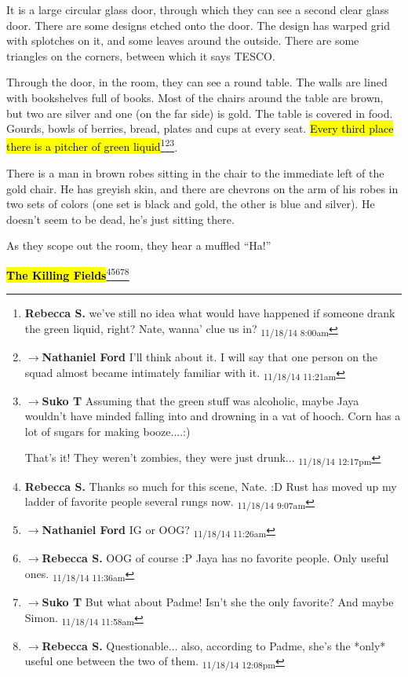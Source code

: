 It is a large circular glass door, through which they can see a second clear glass door.  There are some designs etched onto the door.  The design has warped grid with splotches on it, and some leaves around the outside.  There are some triangles on the corners, between which it says TESCO.



Through the door, in the room, they can see a round table.  The walls are lined with bookshelves full of books.  Most of the chairs around the table are brown, but two are silver and one (on the far side) is gold.  The table is covered in food.  Gourds, bowls of berries, bread, plates and cups at every seat.  \hl{Every third place there is a pitcher of green liquid}\footnote{\textbf{Rebecca S. }we've still no idea what would have happened if someone drank the green liquid, right?  Nate, wanna' clue us in? \textsubscript{11/18/14 8:00am}}\footnote{$\rightarrow$\textbf{Nathaniel Ford }I'll think about it. I will say that one person on the squad almost became intimately familiar with it. \textsubscript{11/18/14 11:21am}}\footnote{$\rightarrow$\textbf{Suko T }Assuming that the green stuff was alcoholic, maybe Jaya wouldn't have minded falling into and drowning in a vat of hooch.  Corn has a lot of sugars for making booze....:)

That's it!  They weren't zombies, they were just drunk... \textsubscript{11/18/14 12:17pm}}.



There is a man in brown robes sitting in the chair to the immediate left of the gold chair.  He has greyish skin, and there are chevrons on the arm of his robes in two sets of colors (one set is black and gold, the other is blue and silver).  He doesn't seem to be dead, he's just sitting there.



As they scope out the room, they hear a muffled ``Ha!''





\textbf{\hl{The Killing Fields}}\footnote{\textbf{Rebecca S. }Thanks so much for this scene, Nate. :D  Rust has moved up my ladder of favorite people several rungs now. \textsubscript{11/18/14 9:07am}}\footnote{$\rightarrow$\textbf{Nathaniel Ford }IG or OOG? \textsubscript{11/18/14 11:26am}}\footnote{$\rightarrow$\textbf{Rebecca S. }OOG of course :P 
Jaya has no favorite people.  Only useful ones. \textsubscript{11/18/14 11:36am}}\footnote{$\rightarrow$\textbf{Suko T }But what about Padme!  Isn't she the only favorite?  And maybe Simon. \textsubscript{11/18/14 11:58am}}\footnote{$\rightarrow$\textbf{Rebecca S. }Questionable...  also, according to Padme, she's the *only* useful one between the two of them. \textsubscript{11/18/14 12:08pm}}



